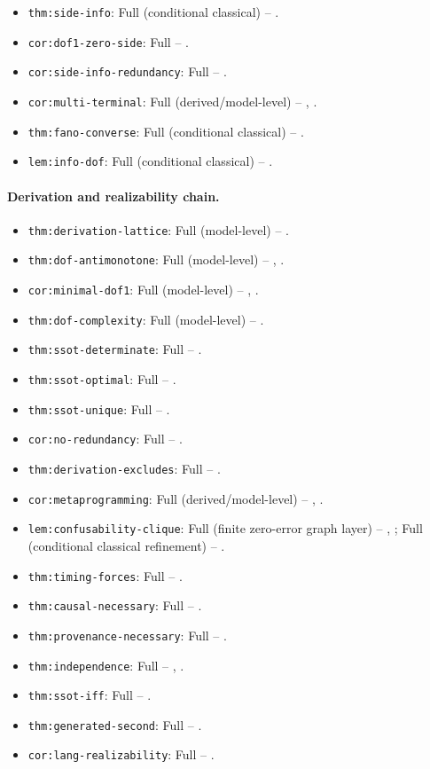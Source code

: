 \begin{itemize}
\item \nolinkurl{thm:side-info}: Full (conditional classical) -- .
\item \nolinkurl{cor:dof1-zero-side}: Full -- .
\item \nolinkurl{cor:side-info-redundancy}: Full -- .
\item \nolinkurl{cor:multi-terminal}: Full (derived/model-level) -- , .
\item \nolinkurl{thm:fano-converse}: Full (conditional classical) -- .
\item \nolinkurl{lem:info-dof}: Full (conditional classical) -- .
\end{itemize}

\paragraph{Derivation and realizability chain.}
\begin{itemize}
\item \nolinkurl{thm:derivation-lattice}: Full (model-level) -- .
\item \nolinkurl{thm:dof-antimonotone}: Full (model-level) -- , .
\item \nolinkurl{cor:minimal-dof1}: Full (model-level) -- , .
\item \nolinkurl{thm:dof-complexity}: Full (model-level) -- .
\item \nolinkurl{thm:ssot-determinate}: Full -- .
\item \nolinkurl{thm:ssot-optimal}: Full -- .
\item \nolinkurl{thm:ssot-unique}: Full -- .
\item \nolinkurl{cor:no-redundancy}: Full -- .
\item \nolinkurl{thm:derivation-excludes}: Full -- .
\item \nolinkurl{cor:metaprogramming}: Full (derived/model-level) -- , .
\item \nolinkurl{lem:confusability-clique}: Full (finite zero-error graph layer) -- , ; Full (conditional classical refinement) -- .
\item \nolinkurl{thm:timing-forces}: Full -- .
\item \nolinkurl{thm:causal-necessary}: Full -- .
\item \nolinkurl{thm:provenance-necessary}: Full -- .
\item \nolinkurl{thm:independence}: Full -- , .
\item \nolinkurl{thm:ssot-iff}: Full -- .
\item \nolinkurl{thm:generated-second}: Full -- .
\item \nolinkurl{cor:lang-realizability}: Full -- .
\end{itemize}

